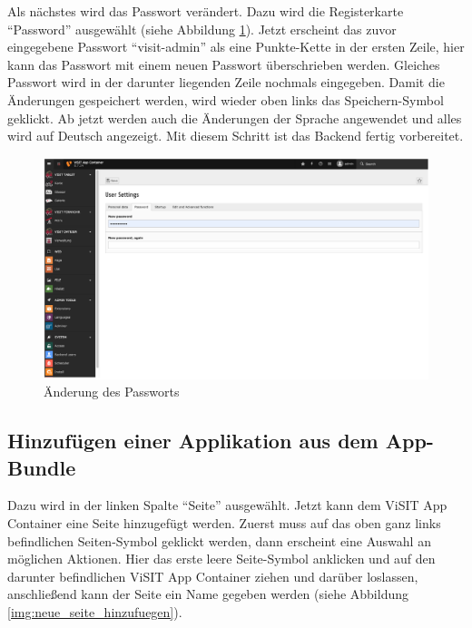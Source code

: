 Als nächstes wird das Passwort verändert. Dazu wird die Registerkarte “Password” ausgewählt (siehe Abbildung \ref{img:aenderung_passwort}). Jetzt erscheint das zuvor eingegebene Passwort “visit-admin” als eine Punkte-Kette in der ersten Zeile, hier kann das Passwort mit einem neuen Passwort überschrieben werden. Gleiches Passwort wird in der darunter liegenden Zeile nochmals eingegeben. Damit die Änderungen gespeichert werden, wird wieder oben links das Speichern-Symbol geklickt. Ab jetzt werden auch die Änderungen der Sprache angewendet und alles wird auf Deutsch angezeigt. Mit diesem Schritt ist das Backend fertig vorbereitet.

\begin{figure}[ht!]
\centering
\includegraphics[width=12cm]{Figures/paula/typo3/aenderung_passwort.png}
\caption{Änderung des Passworts}
\label{img:aenderung_passwort}
\end{figure}

\subsection{Hinzufügen einer Applikation aus dem App-Bundle}

Dazu wird in der linken Spalte “Seite” ausgewählt. Jetzt kann dem ViSIT App Container eine Seite hinzugefügt werden. Zuerst muss auf das oben ganz links befindlichen Seiten-Symbol geklickt werden, dann erscheint eine Auswahl an möglichen Aktionen. Hier das erste leere Seite-Symbol anklicken und auf den darunter befindlichen ViSIT App Container ziehen und darüber loslassen, anschließend kann der Seite ein Name gegeben werden (siehe Abbildung \ref{img:neue_seite_hinzufuegen}).

